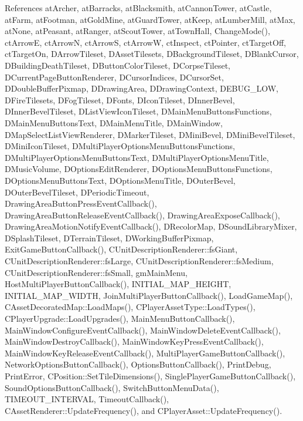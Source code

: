 References at\+Archer, at\+Barracks, at\+Blacksmith, at\+Cannon\+Tower, at\+Castle, at\+Farm, at\+Footman, at\+Gold\+Mine, at\+Guard\+Tower, at\+Keep, at\+Lumber\+Mill, at\+Max, at\+None, at\+Peasant, at\+Ranger, at\+Scout\+Tower, at\+Town\+Hall, Change\+Mode(), ct\+ArrowE, ct\+ArrowN, ct\+ArrowS, ct\+ArrowW, ct\+Inspect, ct\+Pointer, ct\+Target\+Off, ct\+Target\+On, D\+Arrow\+Tileset, D\+Asset\+Tilesets, D\+Background\+Tileset, D\+Blank\+Cursor, D\+Building\+Death\+Tileset, D\+Button\+Color\+Tileset, D\+Corpse\+Tileset, D\+Current\+Page\+Button\+Renderer, D\+Cursor\+Indices, D\+Cursor\+Set, D\+Double\+Buffer\+Pixmap, D\+Drawing\+Area, D\+Drawing\+Context, D\+E\+B\+U\+G\+\_\+\+L\+OW, D\+Fire\+Tilesets, D\+Fog\+Tileset, D\+Fonts, D\+Icon\+Tileset, D\+Inner\+Bevel, D\+Inner\+Bevel\+Tileset, D\+List\+View\+Icon\+Tileset, D\+Main\+Menu\+Buttons\+Functions, D\+Main\+Menu\+Buttons\+Text, D\+Main\+Menu\+Title, D\+Main\+Window, D\+Map\+Select\+List\+View\+Renderer, D\+Marker\+Tileset, D\+Mini\+Bevel, D\+Mini\+Bevel\+Tileset, D\+Mini\+Icon\+Tileset, D\+Multi\+Player\+Options\+Menu\+Buttons\+Functions, D\+Multi\+Player\+Options\+Menu\+Buttons\+Text, D\+Multi\+Player\+Options\+Menu\+Title, D\+Music\+Volume, D\+Options\+Edit\+Renderer, D\+Options\+Menu\+Buttons\+Functions, D\+Options\+Menu\+Buttons\+Text, D\+Options\+Menu\+Title, D\+Outer\+Bevel, D\+Outer\+Bevel\+Tileset, D\+Periodic\+Timeout, Drawing\+Area\+Button\+Press\+Event\+Callback(), Drawing\+Area\+Button\+Release\+Event\+Callback(), Drawing\+Area\+Expose\+Callback(), Drawing\+Area\+Motion\+Notify\+Event\+Callback(), D\+Recolor\+Map, D\+Sound\+Library\+Mixer, D\+Splash\+Tileset, D\+Terrain\+Tileset, D\+Working\+Buffer\+Pixmap, Exit\+Game\+Button\+Callback(), C\+Unit\+Description\+Renderer\+::fs\+Giant, C\+Unit\+Description\+Renderer\+::fs\+Large, C\+Unit\+Description\+Renderer\+::fs\+Medium, C\+Unit\+Description\+Renderer\+::fs\+Small, gm\+Main\+Menu, Host\+Multi\+Player\+Button\+Callback(), I\+N\+I\+T\+I\+A\+L\+\_\+\+M\+A\+P\+\_\+\+H\+E\+I\+G\+HT, I\+N\+I\+T\+I\+A\+L\+\_\+\+M\+A\+P\+\_\+\+W\+I\+D\+TH, Join\+Multi\+Player\+Button\+Callback(), Load\+Game\+Map(), C\+Asset\+Decorated\+Map\+::\+Load\+Maps(), C\+Player\+Asset\+Type\+::\+Load\+Types(), C\+Player\+Upgrade\+::\+Load\+Upgrades(), Main\+Menu\+Button\+Callback(), Main\+Window\+Configure\+Event\+Callback(), Main\+Window\+Delete\+Event\+Callback(), Main\+Window\+Destroy\+Callback(), Main\+Window\+Key\+Press\+Event\+Callback(), Main\+Window\+Key\+Release\+Event\+Callback(), Multi\+Player\+Game\+Button\+Callback(), Network\+Options\+Button\+Callback(), Options\+Button\+Callback(), Print\+Debug, Print\+Error, C\+Position\+::\+Set\+Tile\+Dimensions(), Single\+Player\+Game\+Button\+Callback(), Sound\+Options\+Button\+Callback(), Switch\+Button\+Menu\+Data(), T\+I\+M\+E\+O\+U\+T\+\_\+\+I\+N\+T\+E\+R\+V\+AL, Timeout\+Callback(), C\+Asset\+Renderer\+::\+Update\+Frequency(), and C\+Player\+Asset\+::\+Update\+Frequency().



